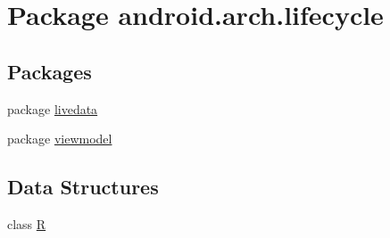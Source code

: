 \hypertarget{namespaceandroid_1_1arch_1_1lifecycle}{}\section{Package android.\+arch.\+lifecycle}
\label{namespaceandroid_1_1arch_1_1lifecycle}
\subsection*{Packages}
\begin{DoxyCompactItemize}
\item 
package \mbox{\hyperlink{namespaceandroid_1_1arch_1_1lifecycle_1_1livedata}{livedata}}
\item 
package \mbox{\hyperlink{namespaceandroid_1_1arch_1_1lifecycle_1_1viewmodel}{viewmodel}}
\end{DoxyCompactItemize}
\subsection*{Data Structures}
\begin{DoxyCompactItemize}
\item 
class \mbox{\hyperlink{classandroid_1_1arch_1_1lifecycle_1_1_r}{R}}
\end{DoxyCompactItemize}
